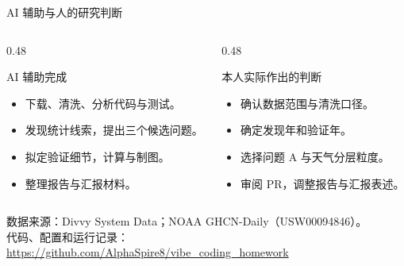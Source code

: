 \documentclass[aspectratio=169,11pt]{beamer}
\begin{document}
\begin{frame}{AI 辅助与人的研究判断}
  \begin{columns}[T,onlytextwidth]
    \begin{column}{0.48\textwidth}
      \begin{block}{AI 辅助完成}
        \begin{itemize}
          \item 下载、清洗、分析代码与测试。
          \item 发现统计线索，提出三个候选问题。
          \item 拟定验证细节，计算与制图。
          \item 整理报告与汇报材料。
        \end{itemize}
      \end{block}
    \end{column}
    \begin{column}{0.48\textwidth}
      \begin{block}{本人实际作出的判断}
        \begin{itemize}
          \item 确认数据范围与清洗口径。
          \item 确定发现年和验证年。
          \item 选择问题 A 与天气分层粒度。
          \item 审阅 PR，调整报告与汇报表述。
        \end{itemize}
      \end{block}
    \end{column}
  \end{columns}
  \medskip
  {\scriptsize 数据来源：Divvy System Data；NOAA GHCN-Daily（USW00094846）。\\
  代码、配置和运行记录：\url{https://github.com/AlphaSpire8/vibe_coding_homework}}
\end{frame}
\end{document}
